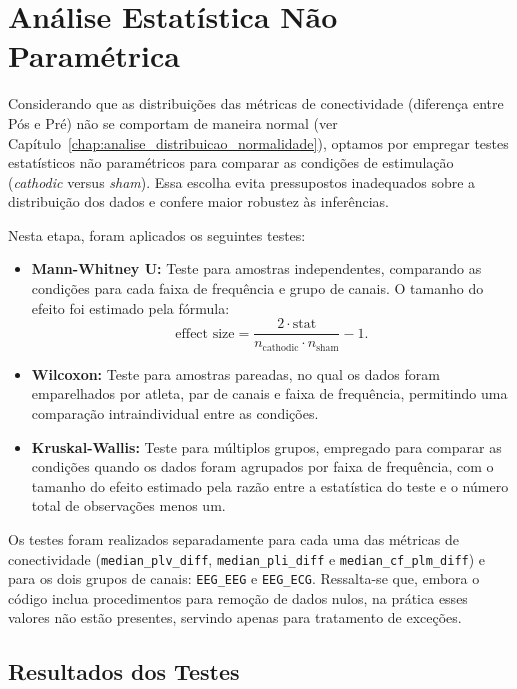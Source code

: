 \chapter{Análise Estatística Não Paramétrica}
\label{chap:analise_estatistica_np}

Considerando que as distribuições das métricas de conectividade (diferença entre Pós e Pré) não se comportam de maneira normal (ver Capítulo~\ref{chap:analise_distribuicao_normalidade}), optamos por empregar testes estatísticos não paramétricos para comparar as condições de estimulação (\texorpdfstring{\textit{cathodic} versus \textit{sham}}{cathodic versus sham}). Essa escolha evita pressupostos inadequados sobre a distribuição dos dados e confere maior robustez às inferências.

Nesta etapa, foram aplicados os seguintes testes:
\begin{itemize}
    \item \textbf{Mann-Whitney U:} Teste para amostras independentes, comparando as condições para cada faixa de frequência e grupo de canais. O tamanho do efeito foi estimado pela fórmula:
    \[
    \text{effect size} = \frac{2\cdot \text{stat}}{n_{\text{cathodic}} \cdot n_{\text{sham}}} - 1.
    \]
    \item \textbf{Wilcoxon:} Teste para amostras pareadas, no qual os dados foram emparelhados por atleta, par de canais e faixa de frequência, permitindo uma comparação intraindividual entre as condições.
    \item \textbf{Kruskal-Wallis:} Teste para múltiplos grupos, empregado para comparar as condições quando os dados foram agrupados por faixa de frequência, com o tamanho do efeito estimado pela razão entre a estatística do teste e o número total de observações menos um.
\end{itemize}

Os testes foram realizados separadamente para cada uma das métricas de conectividade (\texttt{median\_plv\_diff}, \texttt{median\_pli\_diff} e \texttt{median\_cf\_plm\_diff}) e para os dois grupos de canais: \texttt{EEG\_EEG} e \texttt{EEG\_ECG}. Ressalta-se que, embora o código inclua procedimentos para remoção de dados nulos, na prática esses valores não estão presentes, servindo apenas para tratamento de exceções.

\section{Resultados dos Testes}

